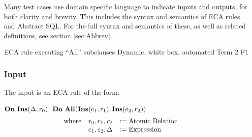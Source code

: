 \documentclass[12pt]{report}
\begin{document}
Many test cases use domain specific language to indicate inputs and outputs, for
both clarity and brevity. This includes the syntax and semantics of ECA rules
and Abstract SQL. For the full syntax and semantics of these, as well as
related definitions, see section \ref{sec:Abbrev}.








{ECA rule executing ``All'' subclauses}  %
{Dynamic, white box, automated}  
{Term 2}
{F1}
\vspace{-12pt}\subsubsection*{Input}
The input is an ECA rule of the form:

$\mathbf{On~} \mathbf{Ins}(\Delta,r_0) \,\,\,\,\mathbf{Do~} \mathbf{All} ( \mathbf{Ins}(e_1,r_1), \mathbf{Ins}(e_2,r_2) )$
\vspace{-10pt}\[\hspace{-20pt}\begin{array}{lll}
\text{where} & r_0, r_1, r_2    & := \text{Atomic Relation} \\ 
             & e_1, e_2, \Delta & := \text{Expression} \\ 
\end{array}\]
\end{document}
